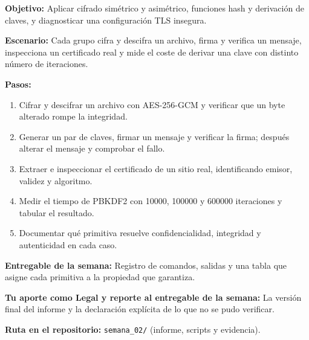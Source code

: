 \documentclass[11pt,a4paper]{article}
\begin{document}
\begin{tcolorbox}[cajaContenido,title={Semana 2 --- Caja de herramientas criptográficas}]
\textbf{Objetivo:} Aplicar cifrado simétrico y asimétrico, funciones hash y derivación de claves, y diagnosticar una configuración TLS insegura.

\textbf{Escenario:} Cada grupo cifra y descifra un archivo, firma y verifica un mensaje, inspecciona un certificado real y mide el coste de derivar una clave con distinto número de iteraciones.


\textbf{Pasos:}
\begin{enumerate}[leftmargin=1.4em,itemsep=2pt,topsep=3pt]
  \item Cifrar y descifrar un archivo con AES-256-GCM y verificar que un byte alterado rompe la integridad.
  \item Generar un par de claves, firmar un mensaje y verificar la firma; después alterar el mensaje y comprobar el fallo.
  \item Extraer e inspeccionar el certificado de un sitio real, identificando emisor, validez y algoritmo.
  \item Medir el tiempo de PBKDF2 con 10000, 100000 y 600000 iteraciones y tabular el resultado.
  \item Documentar qué primitiva resuelve confidencialidad, integridad y autenticidad en cada caso.
\end{enumerate}
\textbf{Entregable de la semana:} Registro de comandos, salidas y una tabla que asigne cada primitiva a la propiedad que garantiza.

\textbf{Tu aporte como Legal y reporte al entregable de la semana:} La versión final del informe y la declaración explícita de lo que no se pudo verificar.

\textbf{Ruta en el repositorio:} \texttt{semana\_02/} (informe, scripts y evidencia).
\end{tcolorbox}
\end{document}
